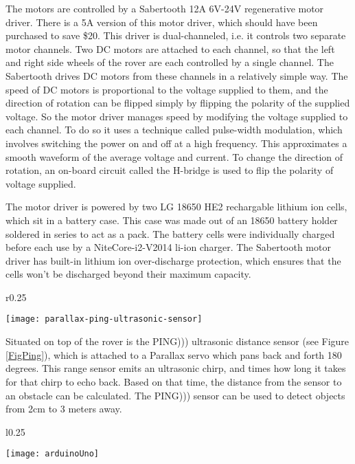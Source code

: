 The motors are controlled by a Sabertooth 12A 6V-24V regenerative motor driver. There is a 5A version of this motor driver, which should have been purchased to save \$20. This driver is dual-channeled, i.e. it controls two separate motor channels. Two DC motors are attached to each channel, so that the left and right side wheels of the rover are each controlled by a single channel. The Sabertooth drives DC motors from these channels in a relatively simple way. The speed of DC motors is proportional to the voltage supplied to them, and the direction of rotation can be flipped simply by flipping the polarity of the supplied voltage. So the motor driver manages speed by modifying the voltage supplied to each channel. To do so it uses a technique called pulse-width modulation, which involves switching the power on and off at a high frequency. This approximates a smooth waveform of the average voltage and current. To change the direction of rotation, an on-board circuit called the H-bridge is used to flip the polarity of voltage supplied. \cite{dcMotorBlog}


The motor driver is powered by two LG 18650 HE2 rechargable lithium ion cells, which sit in a battery case. This case was made out of an 18650 battery holder soldered in series to act as a pack. The battery cells were individually charged before each use by a NiteCore-i2-V2014 li-ion charger. The Sabertooth motor driver has built-in lithium ion over-discharge protection, which ensures that the cells won't be discharged beyond their maximum capacity.

\begin{wrapfigure}{r}{0.25\textwidth} %
	\caption{\cite{fig_ping}}
	\centering
	\texttt{[image: parallax-ping-ultrasonic-sensor]}
	\label{FigPing}
\end{wrapfigure}

Situated on top of the rover is the PING))) ultrasonic distance sensor (see Figure \ref{FigPing}), which is attached to a Parallax servo which pans back and forth 180 degrees. This range sensor emits an ultrasonic chirp, and times how long it takes for that chirp to echo back. Based on that time, the distance from the sensor to an obstacle can be calculated. The PING))) sensor can be used to detect objects from 2cm to 3 meters away. \cite{pingDocumentation}

\begin{wrapfigure}{l}{0.25\textwidth}
	\caption{\cite{fig_arduino_uno}}
	\centering
	\texttt{[image: arduinoUno]}
	\label{FigArduino}
\end{wrapfigure}

